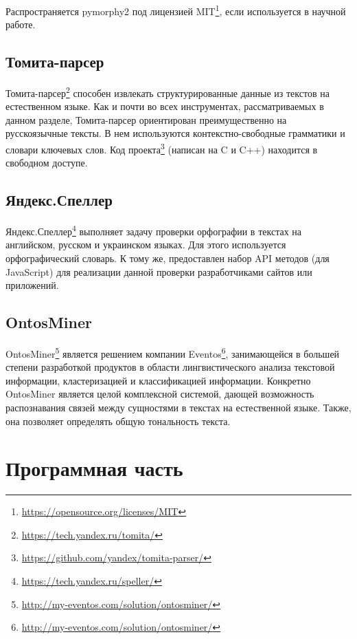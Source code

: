 \documentclass[14pt]{matmex-diploma-custom}
\begin{document}
Распространяется pymorphy2 под лицензией MIT\footnote{\url{https://opensource.org/licenses/MIT}}, если используется в научной работе.

\subsection{Томита-парсер}

Томита-парсер\footnote{\url{https://tech.yandex.ru/tomita/}} способен извлекать структурированные данные из текстов на естественном языке. Как и почти во всех инструментах, рассматриваемых в данном разделе, Томита-парсер ориентирован преимущественно на русскоязычные тексты. В нем используются контекстно-свободные грамматики и словари ключевых слов. Код проекта\footnote{\url{https://github.com/yandex/tomita-parser/}} (написан на C и C++) находится в свободном доступе.

\subsection{Яндекс.Спеллер}

Яндекс.Спеллер\footnote{\url{https://tech.yandex.ru/speller/}} выполняет задачу проверки орфографии в текстах на английском, русском и украинском языках. Для этого используется орфографический словарь. К тому же, предоставлен набор API методов (для JavaScript) для реализации данной проверки разработчиками сайтов или приложений.

\subsection{OntosMiner}

OntosMiner\footnote{\url{http://my-eventos.com/solution/ontosminer/}} является решением компании Eventos\footnote{\url{http://my-eventos.com/solution/ontosminer/}}, занимающейся в большей степени разработкой продуктов в области лингвистического анализа текстовой информации, кластеризацией и классификацией информации. Конкретно OntosMiner является целой комплексной системой, дающей возможность распознавания связей между сущностями в текстах на естественной языке. Также, она позволяет определять общую тональность текста.

\clearpage\section{Программная часть}

\label{sec:program}
\end{document}
